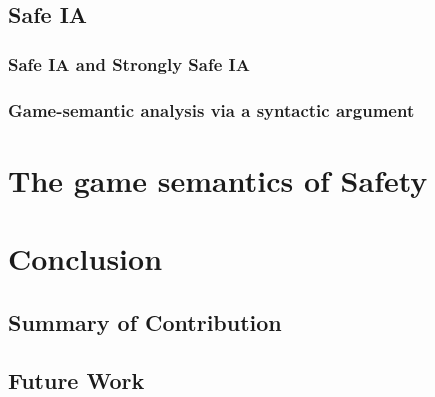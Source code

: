     \section{Safe IA}
        \subsection{Safe IA and Strongly Safe IA}
        \subsection{Game-semantic analysis via a syntactic argument}
        
        


\chapter{The game semantics of Safety}

    



\chapter{Conclusion}
    \section{Summary of Contribution}
    \section{Future Work}



    
    

         {\protect{}}
